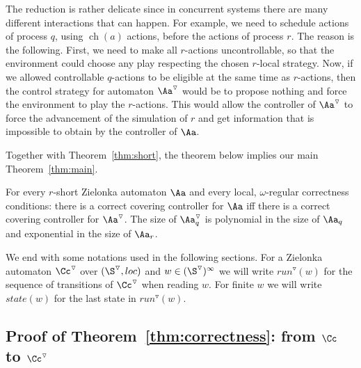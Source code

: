 \documentclass[10pt,a4paper]{article}
\newcommand{\igw}[1]{}
\newcommand{\run}{\mathit{run}}
\newcommand{\red}[1]{#1^\triangledown}
\newcommand{\state}{\mathit{state}}
\newcommand{\ch}{\mathop{ch}}
\begin{document}
The reduction is rather delicate since in concurrent systems there are
many different interactions that can happen.  For example, we need to
schedule actions of process $q$, using $\ch(a)$ actions, before the
actions of process $r$. The reason is the following. First, we need to
make all $r$-actions uncontrollable, so that the environment could
choose any play respecting the chosen $r$-local strategy. Now, if we
allowed controllable $q$-actions to be eligible at the same time as
$r$-actions, then the control strategy for automaton $\red\Aa$ would
be to propose nothing and force the environment to play the
$r$-actions. \igw{added some explanations} This would allow the
controller of $\red\Aa$ to force the advancement of the simulation of
$r$ and get information that is impossible to obtain by the controller
of $\Aa$.

Together with Theorem~\ref{thm:short}, the theorem below implies 
our main
Theorem~\ref{thm:main}. 

\begin{theorem}\label{thm:correctness}
  For every $r$-short Zielonka automaton $\Aa$ and every local,
  $\omega$-regular
  correctness conditions: there is a correct covering controller for
  $\Aa$ iff there is a correct covering controller for $\red\Aa$. 
  The size of $\red\Aa_q$ is polynomial in the size of $\Aa_q$ and
  exponential in the size of $\Aa_r$.
\end{theorem}

We end with some notations used in the following sections. For a
Zielonka automaton $\red\Cc$ over $(\red\S,loc)$ and $w
\in(\red\S)^\infty$ we will write $\red\run(w)$ for the sequence of transitions of $\red\Cc$ when
  reading $w$. For finite $w$ we will write $\state(w)$ for the last state in
  $\red\run(w)$.



























\subsection{Proof of Theorem~\ref{thm:correctness}: from $\Cc$
                                to $\red\Cc$}\label{sec:C}
\end{document}

